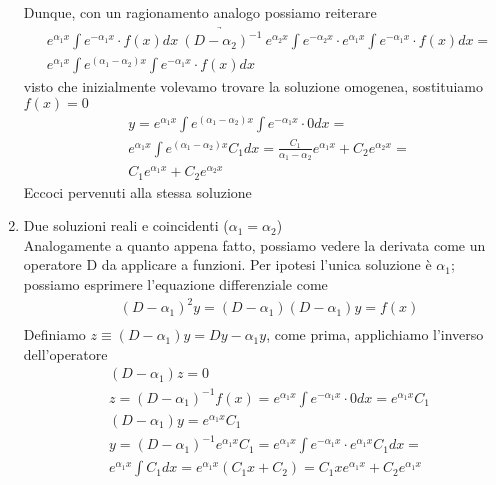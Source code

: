 \documentclass[10pt,a4paper]{article}
\begin{document}
\begin{enumerate}
	Dunque, con un ragionamento analogo possiamo reiterare
	\begin{align*}
		&e^{\alpha_1 x} \int e^{-\alpha_1 x}\cdot f(x) dx\ \underrightarrow{(D-\alpha_2)^{-1}}\ e^{\alpha_2 x} \int e^{-\alpha_2 x}\cdot e^{\alpha_1 x} \int e^{-\alpha_1 x}\cdot f(x) dx =\\
		&e^{\alpha_1 x}\int e^{(\alpha_1 -\alpha_2) x} \int  e^{-\alpha_1 x}\cdot f(x) dx 
	\end{align*}
	visto che inizialmente volevamo trovare la soluzione omogenea, sostituiamo \(f(x) = 0\)
	\begin{align*}
	&y = e^{\alpha_1 x}\int e^{(\alpha_1 -\alpha_2) x} \int  e^{-\alpha_1 x}\cdot 0 dx =\\
	&e^{\alpha_1 x}\int e^{(\alpha_1 -\alpha_2) x}C_1 dx = \frac{C_1}{\alpha_1 - \alpha_2} e^{\alpha_1 x} + C_2 e^{\alpha_2 x} =\\ &C_1e^{\alpha_1 x} + C_2 e^{\alpha_2 x} 
	\end{align*}
	Eccoci pervenuti alla stessa soluzione
	
	\item Due soluzioni reali e coincidenti (\(\alpha_1 = \alpha_2\))\\
	Analogamente a quanto appena fatto, possiamo vedere la derivata come un operatore D da applicare a funzioni. Per ipotesi l'unica soluzione è $\alpha_1$; possiamo esprimere l'equazione differenziale come
	\begin{align*}
		&(D-\alpha_1)^2 y=(D-\alpha_1)(D-\alpha_1)y= f(x)\\
	\end{align*}
	Definiamo \(z \equiv (D-\alpha_1) y = Dy - \alpha_1 y \), come prima, applichiamo l'inverso dell'operatore
	\begin{align*}
		&(D-\alpha_1) z = 0\\
		&z = (D-\alpha_1)^{-1}f(x) =  e^{\alpha_1 x} \int e^{-\alpha_1 x}\cdot 0 dx = e^{\alpha_1 x}C_1\\
		& (D-\alpha_1)y = e^{\alpha_1 x}C_1\\
		&y = (D-\alpha_1)^{-1}e^{\alpha_1 x}C_1 = e^{\alpha_1 x} \int e^{-\alpha_1 x}\cdot e^{\alpha_1 x}C_1 dx=\\
		&e^{\alpha_1 x} \int C_1 dx = e^{\alpha_1 x}(C_1 x+C_2) = C_1 x e^{\alpha_1 x} + C_2 e^{\alpha_1 x}
	\end{align*}


\end{enumerate}
\end{document}
